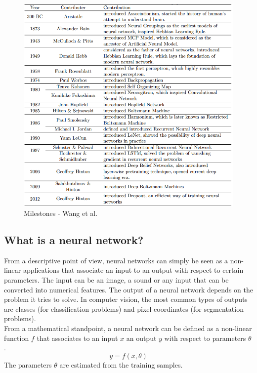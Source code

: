 \begin{figure}[!h]
\centering
\includegraphics[width=1\textwidth, keepaspectratio=true]{./figures/history.png}
\caption{Milestones - Wang et al. \cite{14}}
\label{history}
\end{figure}

 
\subsection{What is a neural network?}
\label{what_is_a_neural_network}

From a descriptive point of view, neural networks can simply be seen as a non-linear applications that associate an input to an output with respect to certain parameters. The input can be an image, a sound or any input that can be converted into numerical features. The output of a neural network depends on the problem it tries to solve. In computer vision, the most common types of outputs are classes (for classification problems) and pixel coordinates (for segmentation problems).\\
From a mathematical standpoint, a neural network can be defined as a non-linear function $f$ that associates to an input $x$ an output $y$ with respect to parameters $\theta$.
\begin{equation}
y = f(x,\theta)
\end{equation}
The parameters $\theta$ are estimated from the training samples.

